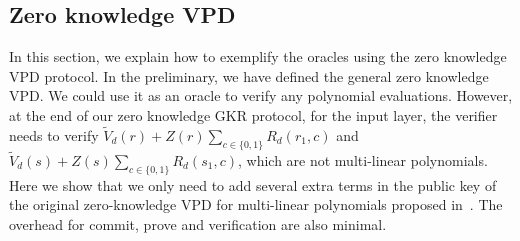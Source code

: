 \subsection{Zero knowledge VPD}\label{sec::zkvpd}
In this section, we explain how to exemplify the oracles using the zero knowledge VPD protocol. In the preliminary, we have defined the general zero knowledge VPD. We could use it as an oracle to verify any polynomial evaluations. However, at the end of our zero knowledge GKR protocol, for the input layer, the verifier needs to verify $\tilde{V}_d(r) + Z(r)\sum\limits_{c \in \{0, 1\}}R_d(r_1, c)$ and $\tilde{V}_d(s) + Z(s)\sum\limits_{c \in \{0, 1\}}R_d(s_1, c)$, which are not multi-linear polynomials. Here we show that we only need to add several extra terms in the public key of the original zero-knowledge VPD for multi-linear polynomials proposed in~\cite{zkvpd}. The overhead for commit, prove and verification are also minimal.

